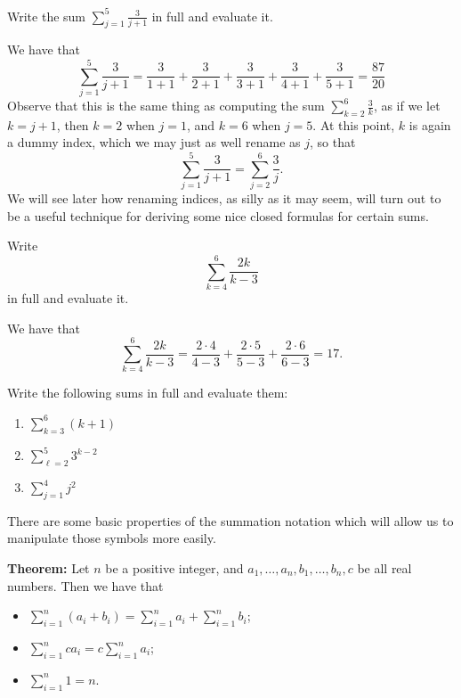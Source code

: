 \documentclass[nooutcomes]{ximera}
\begin{document}
\begin{example}
  Write the sum $\sum_{j=1}^5 \frac{3}{j+1}$ in full and evaluate it.

  \begin{explanation}
    We have that $$\sum_{j=1}^5 \frac{3}{j+1} = \frac{3}{1+1}+\frac{3}{2+1}+\frac{3}{3+1}+\frac{3}{4+1}+\frac{3}{5+1} = \frac{87}{20}$$Observe that this is the same thing as computing the sum $\sum_{k=2}^6 \frac{3}{k}$, as if we let $k=j+1$, then $k=2$ when $j=1$, and $k=6$ when $j=5$. At this point, $k$ is again a dummy index, which we may just as well rename as $j$, so that $$\sum_{j=1}^5 \frac{3}{j+1}=\sum_{j=2}^6\frac{3}{j}.$$We will see later how renaming indices, as silly as it may seem, will turn out to be a useful technique for deriving some nice closed formulas for certain sums.
  \end{explanation}
\end{example}

\begin{example}
  Write $$\sum_{k=4}^6 \frac{2k}{k-3}$$ in full and evaluate it.

  \begin{explanation}
    We have that $$\sum_{k=4}^6 \frac{2k}{k-3} = \frac{2\cdot 4}{4-3}+\frac{2\cdot 5}{5-3} + \frac{2\cdot 6}{6-3} = 17.$$
  \end{explanation}
\end{example}

\begin{exploration}
  Write the following sums in full and evaluate them:

  \begin{enumerate}
  \item $\sum_{k=3}^6 (k+1)$
  \item $\sum_{\ell=2}^5 3^{k-2}$
  \item $\sum_{j=1}^4 j^2$
  \end{enumerate}
\end{exploration}

There are some basic properties of the summation notation which will allow us to manipulate those symbols more easily.

\begin{callout}
  {\bf Theorem:} Let $n$ be a positive integer, and $a_1,\ldots,a_n,b_1,\ldots,b_n,c$ be all real numbers. Then we have that
  \begin{itemize}
  \item $\sum_{i=1}^n (a_i+b_i) = \sum_{i=1}^n a_i + \sum_{i=1}^n b_i$;
  \item $\sum_{i=1}^n ca_i = c\sum_{i=1}^na_i$;
  \item $\sum_{i=1}^n 1 = n$.
  \end{itemize}
\end{callout}
\end{document}
